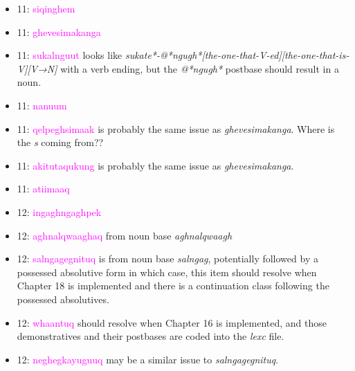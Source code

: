 \documentclass{article}
\begin{document}
\begin{itemize}
\item 11: \textcolor{magenta}{siqinghem}

\item 11: \textcolor{magenta}{ghevesimakanga}

\item 11: \textcolor{magenta}{sukalnguut} looks like \textit{sukate*-@*ngugh*[the-one-that-V-ed][the-one-that-is-V][V→N]} with a verb ending, but the \textit{@*ngugh*} postbase should result in a noun.

\item 11: \textcolor{magenta}{nanuum}

\item 11: \textcolor{magenta}{qelpeghsimaak} is probably the same issue as \textit{ghevesimakanga}.
%
Where is the \textit{s} coming from??

\item 11: \textcolor{magenta}{akitutaqukung} is probably the same issue as \textit{ghevesimakanga}.

\item 11: \textcolor{magenta}{atiimaaq}

\item 12: \textcolor{magenta}{ingaghngaghpek}

\item 12: \textcolor{magenta}{aghnalqwaaghaq} from noun base \textit{aghnalqwaagh}

\item 12: \textcolor{magenta}{salngagegnituq} is from noun base \textit{salngag}, potentially followed by a possessed absolutive form in which case, this item should resolve when Chapter 18 is implemented and there is a continuation class following the possessed absolutives.

\item 12: \textcolor{magenta}{whaantuq} should resolve when Chapter 16 is implemented, and those demonstratives and their postbases are coded into the \textit{lexc} file.

\item 12: \textcolor{magenta}{neghegkayuguuq} may be a similar issue to \textit{salngagegnituq}.


\end{itemize}
\end{document}
